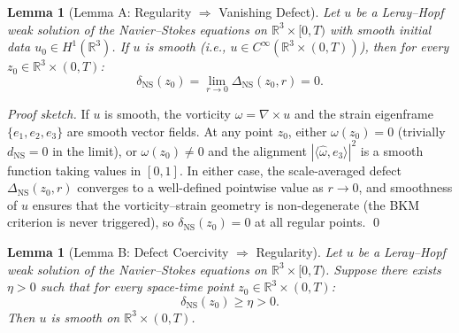 \documentclass[11pt]{article}
\newtheorem{lemma}[theorem]{Lemma}
\theoremstyle{definition}
\theoremstyle{remark}
\begin{document}

\begin{lemma}[Lemma A: Regularity $\Rightarrow$ Vanishing Defect]
\label{lem:ns-A}
Let $u$ be a Leray--Hopf weak solution of the Navier--Stokes equations on
$\mathbb{R}^3 \times [0,T)$ with smooth initial data
$u_0 \in H^1(\mathbb{R}^3)$.  If $u$ is smooth
(i.e., $u \in C^\infty(\mathbb{R}^3 \times (0,T))$), then for every
$z_0 \in \mathbb{R}^3 \times (0,T)$:
\[
  \delta_{\mathrm{NS}}(z_0) = \lim_{r \to 0} \Delta_{\mathrm{NS}}(z_0, r) = 0.
\]
\end{lemma}

\begin{proof}[Proof sketch]
If $u$ is smooth, the vorticity $\omega = \nabla \times u$ and the strain
eigenframe $\{e_1, e_2, e_3\}$ are smooth vector fields.  At any point $z_0$,
either $\omega(z_0) = 0$ (trivially $d_{\mathrm{NS}} = 0$ in the limit), or
$\omega(z_0) \neq 0$ and the alignment $|\langle \hat{\omega}, e_3 \rangle|^2$
is a smooth function taking values in $[0,1]$.  In either case, the
scale-averaged defect $\Delta_{\mathrm{NS}}(z_0, r)$ converges to a
well-defined pointwise value as $r \to 0$, and smoothness of $u$ ensures that
the vorticity--strain geometry is non-degenerate (the BKM criterion is never
triggered), so $\delta_{\mathrm{NS}}(z_0) = 0$ at all regular points. \qed
\end{proof}

\begin{lemma}[Lemma B: Defect Coercivity $\Rightarrow$ Regularity]
\label{lem:ns-B}
Let $u$ be a Leray--Hopf weak solution of the Navier--Stokes equations on
$\mathbb{R}^3 \times [0,T)$.  Suppose there exists $\eta > 0$ such that for
every space-time point $z_0 \in \mathbb{R}^3 \times (0,T)$:
\[
  \delta_{\mathrm{NS}}(z_0) \geq \eta > 0.
\]
Then $u$ is smooth on $\mathbb{R}^3 \times (0,T)$.
\end{lemma}
\end{document}
